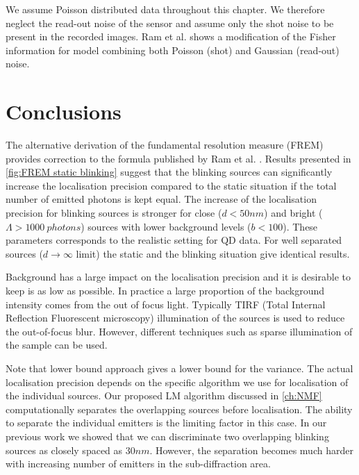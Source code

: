 We assume Poisson distributed data throughout this chapter. We therefore neglect the read-out noise of the sensor and assume only the shot noise to be present in the recorded images. Ram et al. \cite{Ram2006} shows a modification of the Fisher information for model combining both Poisson (shot) and Gaussian (read-out) noise.


\clearpage
\section{Conclusions} 

The alternative derivation of the fundamental resolution measure (FREM) provides correction to the formula published by Ram et al. \cite{Ram2006}. Results presented in \autoref{fig:FREM static blinking} suggest that the blinking sources can significantly increase the localisation precision compared to the static situation if the total number of emitted photons is kept equal. The increase of the localisation precision for blinking sources is stronger for close ($d<50\unit{nm}$) and bright ($\Lambda>1000\ \unit{photons}$) sources with lower background levels ($b<100$). These parameters corresponds to the realistic setting for QD data. For well separated sources ($d\rightarrow\infty$ limit) the static and the blinking situation give identical results. 

Background has a large impact on the localisation precision and it is desirable to keep is as low as possible. In practice a large proportion of the background intensity comes from the out of focus light. Typically TIRF (Total Internal Reflection Fluorescent microscopy) illumination of the sources is used to reduce the out-of-focus blur. However, different techniques such as sparse illumination of the sample can be used. 

Note that \CR lower bound approach gives a lower bound for the variance. The actual localisation precision depends on the specific algorithm we use for localisation of the individual sources. Our proposed LM algorithm discussed in \autoref{ch:NMF} computationally separates the overlapping sources before localisation. The ability to separate the individual emitters is the limiting factor in this case. In our previous work \cite{Mandula2010b} we showed that we can discriminate two overlapping blinking sources as closely spaced as $30\unit{nm}$. However, the separation becomes much harder with increasing number of emitters in the sub-diffraction area.  

